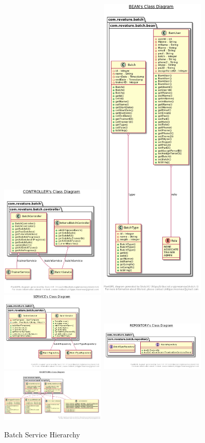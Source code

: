 \begin{figure}[htp]
\centering
\includegraphics[width=5cm]{images/Batchcontroller}
\includegraphics[width=5cm]{images/Batchbean}
\includegraphics[width=5cm]{images/Batchservice}
\includegraphics[width=5cm]{images/Batchrepository}
\includegraphics[width=5cm]{images/Batchexception}
\caption{Batch Service Hierarchy}
\label{fig:lion}
\end{figure}